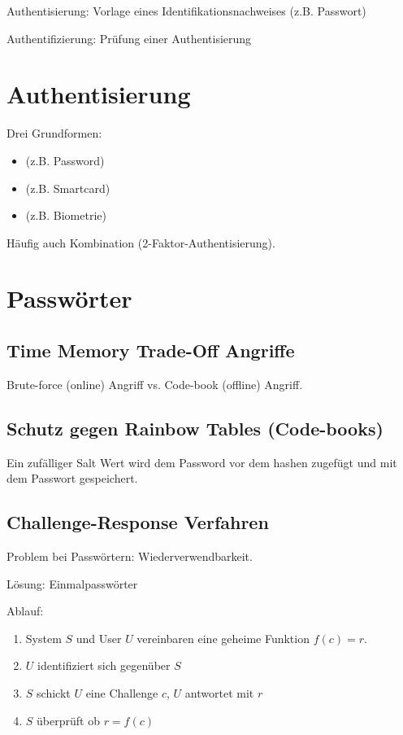 Authentisierung: Vorlage eines Identifikationsnachweises (z.B. Passwort)

Authentifizierung: Prüfung einer Authentisierung

\section{Authentisierung}
Drei Grundformen:
\begin{itemize}
    \item {} (z.B. Password)
    \item {} (z.B. Smartcard)
    \item {} (z.B. Biometrie)
\end{itemize}

Häufig auch Kombination (2-Faktor-Authentisierung).

\section{Passwörter}
\subsection{Time Memory Trade-Off Angriffe}
Brute-force (online) Angriff vs. Code-book (offline) Angriff.

\subsection{Schutz gegen Rainbow Tables (Code-books)}
Ein zufälliger Salt Wert wird dem Password vor dem hashen zugefügt und mit dem Passwort gespeichert.

\subsection{Challenge-Response Verfahren}
Problem bei Passwörtern: Wiederverwendbarkeit.

Lösung: Einmalpasswörter

Ablauf:
\begin{enumerate}
    \item System $S$ und User $U$ vereinbaren eine geheime Funktion $f(c) = r$.
    \item $U$ identifiziert sich gegenüber $S$
    \item $S$ schickt $U$ eine Challenge $c$, $U$ antwortet mit $r$
    \item $S$ überprüft ob $r = f(c)$
\end{enumerate}

